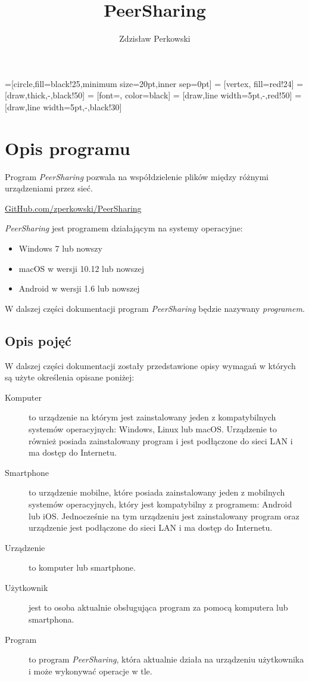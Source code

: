 \documentclass[12pt,a4paper]{article}
\author{Zdzisław Perkowski}
\title{PeerSharing}
\begin{document}
=[circle,fill=black!25,minimum size=20pt,inner sep=0pt]
 = [vertex, fill=red!24]
 = [draw,thick,-,black!50]
 = [font=\tiny, color=black]
 = [draw,line width=5pt,-,red!50]
 = [draw,line width=5pt,-,black!30]

\maketitle
\tableofcontents
\pagebreak


\section{Opis programu}

Program \textit{PeerSharing} pozwala na współdzielenie plików między różnymi urządzeniami przez sieć.

\begin{center}
\href{https://github.com/zperkowski/PeerSharing}{GitHub.com/zperkowski/PeerSharing}
\end{center}

\textit{PeerSharing} jest programem działającym na systemy operacyjne:
\begin{itemize}
	\item Windows 7 lub nowszy
	\item macOS w wersji 10.12 lub nowszej
	\item Android w wersji 1.6 lub nowszej
\end{itemize}

W dalszej części dokumentacji program \textit{PeerSharing} będzie nazywany \textit{programem}.

\subsection{Opis pojęć}

W dalszej części dokumentacji zostały przedstawione opisy wymagań w których są użyte określenia opisane poniżej:

\begin{description}
	\item[Komputer] to urządzenie na którym jest zainstalowany jeden z kompatybilnych systemów operacyjnych: Windows, Linux lub macOS. Urządzenie to również posiada zainstalowany program i jest podłączone do sieci LAN i ma dostęp do Internetu.
	\item[Smartphone] to urządzenie mobilne, które posiada zainstalowany jeden z mobilnych systemów operacyjnych, który jest kompatybilny z programem: Android lub iOS. Jednocześnie na tym urządzeniu jest zainstalowany program oraz urządzenie jest podłączone do sieci LAN i ma dostęp do Internetu.
	\item[Urządzenie] to komputer lub smartphone.
	\item[Użytkownik] jest to osoba aktualnie obsługująca program za pomocą komputera lub smartphona.
	\item[Program] to program \textit{PeerSharing}, która aktualnie działa na urządzeniu użytkownika i może wykonywać operacje w tle.

\end{description}
\end{document}

